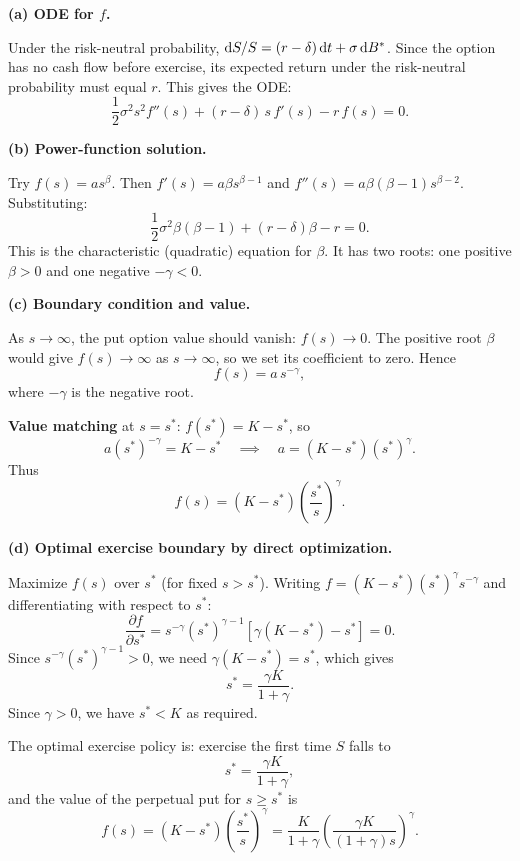 \baselineskip
\textbf{(a) ODE for $f$.}

Under the risk-neutral probability, $\mathrm{d} S/S = (r - \delta)\,\mathrm{d} t + \sigma\,\mathrm{d} B^*$.  Since the option has no cash flow before exercise, its expected return under the risk-neutral probability must equal $r$.  This gives the ODE:
$$\frac{1}{2}\sigma^2 s^2 f''(s) + (r - \delta)\,s\,f'(s) - r\,f(s) = 0.$$

\baselineskip
\textbf{(b) Power-function solution.}

Try $f(s) = as^\beta$.  Then $f'(s) = a\beta s^{\beta - 1}$ and $f''(s) = a\beta(\beta-1)s^{\beta-2}$.  Substituting:
$$\frac{1}{2}\sigma^2\beta(\beta - 1) + (r - \delta)\beta - r = 0.$$
This is the characteristic (quadratic) equation for $\beta$.  It has two roots: one positive $\beta > 0$ and one negative $-\gamma < 0$.

\baselineskip
\textbf{(c) Boundary condition and value.}

As $s \to \infty$, the put option value should vanish: $f(s) \to 0$.  The positive root $\beta$ would give $f(s) \to \infty$ as $s \to \infty$, so we set its coefficient to zero.  Hence
$$f(s) = a\,s^{-\gamma},$$
where $-\gamma$ is the negative root.

\textbf{Value matching} at $s = s^*$: $f(s^*) = K - s^*$, so
$$a(s^*)^{-\gamma} = K - s^* \quad\implies\quad a = (K - s^*)(s^*)^\gamma.$$
Thus
$$f(s) = (K - s^*)\left(\frac{s^*}{s}\right)^\gamma.$$

\baselineskip
\textbf{(d) Optimal exercise boundary by direct optimization.}

Maximize $f(s)$ over $s^*$ (for fixed $s > s^*$).  Writing $f = (K - s^*)(s^*)^\gamma s^{-\gamma}$ and differentiating with respect to $s^*$:
$$\frac{\partial f}{\partial s^*} = s^{-\gamma}(s^*)^{\gamma - 1}\!\left[\gamma(K - s^*) - s^*\right] = 0.$$
Since $s^{-\gamma}(s^*)^{\gamma-1} > 0$, we need $\gamma(K - s^*) = s^*$, which gives
$$s^* = \frac{\gamma K}{1 + \gamma}.$$
Since $\gamma > 0$, we have $s^* < K$ as required.

The optimal exercise policy is: exercise the first time $S$ falls to
$$s^* = \frac{\gamma K}{1 + \gamma},$$
and the value of the perpetual put for $s \ge s^*$ is
$$f(s) = (K - s^*)\left(\frac{s^*}{s}\right)^\gamma = \frac{K}{1+\gamma}\left(\frac{\gamma K}{(1+\gamma)s}\right)^\gamma.$$


